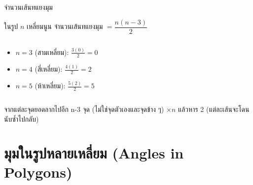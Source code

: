 \documentclass[11pt, aspectratio=169]{beamer}
\begin{document}
\begin{frame}{จำนวนเส้นทแยงมุม}
  \begin{explanation}[สูตร]
    ในรูป $n$ เหลี่ยมนูน จำนวนเส้นทแยงมุม $= \dfrac{n(n-3)}{2}$
  \end{explanation}

  \begin{columns}[T]
      \centering
      \medskip\medskip

      \begin{exambox}[ตัวอย่าง]
        \begin{itemize}
          \item $n=3$ (สามเหลี่ยม): $\frac{3(0)}{2} = 0$
          \item $n=4$ (สี่เหลี่ยม): $\frac{4(1)}{2} = 2$
          \item $n=5$ (ห้าเหลี่ยม): $\frac{5(2)}{2} = 5$
        \end{itemize}
      \end{exambox}
  \end{columns}
  \begin{intuition}[ทำไม?]
    จากแต่ละจุดยอดลากไปอีก n-3 จุด (ไม่ใช่จุดตัวเองและจุดข้าง ๆ) $\times n$ แล้วหาร 2 (แต่ละเส้นจะโดนนับซํ้าไปกลับ)
  \end{intuition}
\end{frame}

\section{มุมในรูปหลายเหลี่ยม (Angles in Polygons)}
\end{document}

